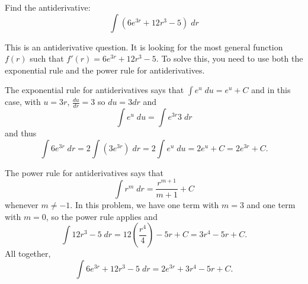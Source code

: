\documentclass{ximera}
\author{Emma Smith Zbarsky}
\begin{document}
\begin{exercise}

Find the antiderivative: \[\int (6e^{3r} +12r^3 -5)\; dr\]


\begin{hint}
	This is an antiderivative question. It is looking for the most general
	function $f(r)$ such that $f'(r) = 6e^{3r}+12r^3-5$. To solve this, you
	need to use both the exponential rule and the power rule for
	antiderivatives.
\end{hint}


\begin{hint}
	The exponential rule for antiderivatives says that
	$\int e^u \; du = e^u+C$ and in this case, with $u= 3r$,
	$\frac{du}{dr} = 3$ so $du = 3dr$ and
	\[\int e^{u}\; du = \int e^{3r} 3\; dr\] and thus
	\[\int 6e^{3r}\; dr = 2 \int \left(3e^{3r}\right)\; dr = 2\int e^u\; du = 2e^u +C = 2e^{3r}+C.\]

	The power rule for antiderivatives says that
	\[\int r^m \; dr = \frac{r^{m+1}}{m+1}+C\] whenever $m\neq -1$. In this
	problem, we have one term with $m=3$ and one term with $m=0$, so the
	power rule applies and
	\[\int 12r^3-5\; dr = 12\left(\frac{r^4}{4}\right)-5r+C = 3r^4-5r+C.\]
	All together, \[\int 6e^{3r}+12r^3-5\; dr = 2e^{3r}+3r^4-5r+C.\]
\end{hint}


\begin{multipleChoice}
\end{multipleChoice}

\end{exercise}
\end{document}
